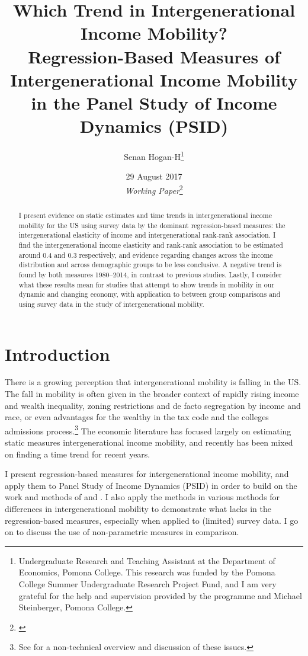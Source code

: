 \documentclass[notitlepage,12pt]{article}
\author{Senan Hogan-H\footnote{Undergraduate Research and Teaching Assistant at the Department of Economics, Pomona College. \newline This research was funded by the Pomona College Summer Undergraduate Research Project Fund, and I am very grateful for the help and supervision provided by the programme and Michael Steinberger, Pomona College.}}
\title{
Which Trend in Intergenerational Income Mobility? \\ \large{Regression-Based Measures of Intergenerational Income Mobility in the Panel Study of Income Dynamics (PSID)}}
\date{29 August 2017  \\
\vspace{15mm}
\textit{Working Paper}\footnote{\href{https://drive.google.com/file/d/0BwswqzI6_NHTdlFaM29Za3JnS0E/view?usp=sharing}{\color{blue}{\underline{A summary of this paper is available in poster form, in accordance with SURP funding requirements.}}}}}
\begin{document}
\maketitle
\thispagestyle{empty}
\begin{abstract}
I present evidence on static  estimates and time trends in intergenerational income mobility for the US using survey data by the dominant regression-based measures: the intergenerational elasticity of income and intergenerational rank-rank association.  I find the intergenerational income elasticity and rank-rank association to be estimated around 0.4 and 0.3 respectively, and evidence regarding changes across the income distribution and across demographic groups to be less conclusive.  A negative trend is found by both measures 1980--2014, in contrast to previous studies.  Lastly, I consider what these results mean for studies that attempt to show trends in mobility in our dynamic and changing economy, with application to between group comparisons and using survey data in the study of intergenerational mobility.
\end{abstract}

\newpage
\setcounter{page}{1}

\section{Introduction}

There is a growing perception that intergenerational mobility is falling in the US.  The fall in mobility is often given in the broader context of rapidly rising income and wealth inequality, zoning restrictions and de facto segregation by income and race, or even advantages for the wealthy in the tax code and the colleges admissions process.\footnote{See \cite{reeves2017dream} for a non-technical overview and discussion of these issues.}  The economic literature has focused largely on estimating static measures intergenerational income mobility, and recently has been mixed on finding a time trend for recent years.

I present regression-based measures for intergenerational income mobility, and apply them to Panel Study of Income Dynamics (PSID) in order to build on the work and methods of \cite{lee2009trends} and \cite{chetty2014united}.  I also apply the methods in various methods for differences in intergenerational mobility to demonstrate what lacks in the regression-based measures, especially when applied to (limited) survey data.  I go on to discuss the use of non-parametric measures in comparison.
\end{document}
